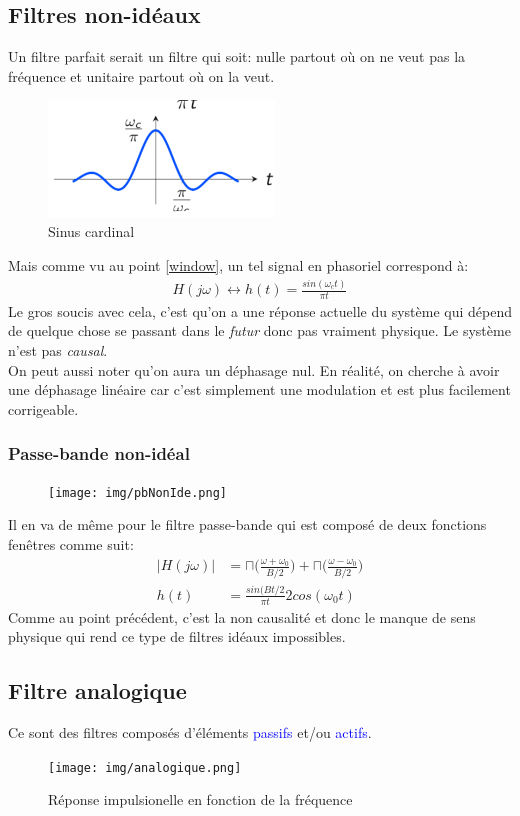 \documentclass{report}
\begin{document}
\subsection{Filtres non-idéaux}
Un filtre parfait serait un filtre qui soit: nulle partout où on ne veut pas la fréquence et unitaire partout où on la veut.\\
\begin{figure}
\centering
\includegraphics[width=6cm]{img/sinc.png}
\caption{Sinus cardinal}
\end{figure}
Mais comme vu au point \ref{window}, un tel signal en phasoriel correspond à:
\begin{align*}
H(j\omega) \longleftrightarrow h(t) = \frac{sin(\omega_c t)}{\pi t}
\end{align*}
Le gros soucis avec cela, c'est qu'on a une réponse actuelle du système qui dépend de quelque chose se passant dans le \textit{futur} donc pas vraiment physique. Le système n'est pas \textit{causal}.\\
On peut aussi noter qu'on aura un déphasage nul. En réalité, on cherche à avoir une déphasage linéaire car c'est simplement une modulation et est plus facilement corrigeable.

\subsubsection{Passe-bande non-idéal}
\begin{figure}
\centering
\texttt{[image: img/pbNonIde.png]}
\end{figure}
Il en va de même pour le filtre passe-bande qui est composé de deux fonctions fenêtres comme suit:
\begin{align*}
|H(j\omega)| &= \sqcap \bigr(\frac{\omega + \omega_0}{B/2}\bigr) + \sqcap \bigr(\frac{\omega - \omega_0}{B/2}\bigr)\\
h(t) &= \frac{sin(Bt/2}{\pi t}2 cos(\omega_0 t)
\end{align*}
Comme au point précédent, c'est la non causalité et donc le manque de sens physique qui rend ce type de filtres idéaux impossibles.

\subsection{Filtre analogique}
Ce sont des filtres composés d'éléments \textcolor{blue}{passifs} et/ou \textcolor{blue}{actifs}. 
\begin{figure}[H]
\centering
\texttt{[image: img/analogique.png]}
\caption{Réponse impulsionelle en fonction de la fréquence}
\label{analogique}
\end{figure}
\end{document}
